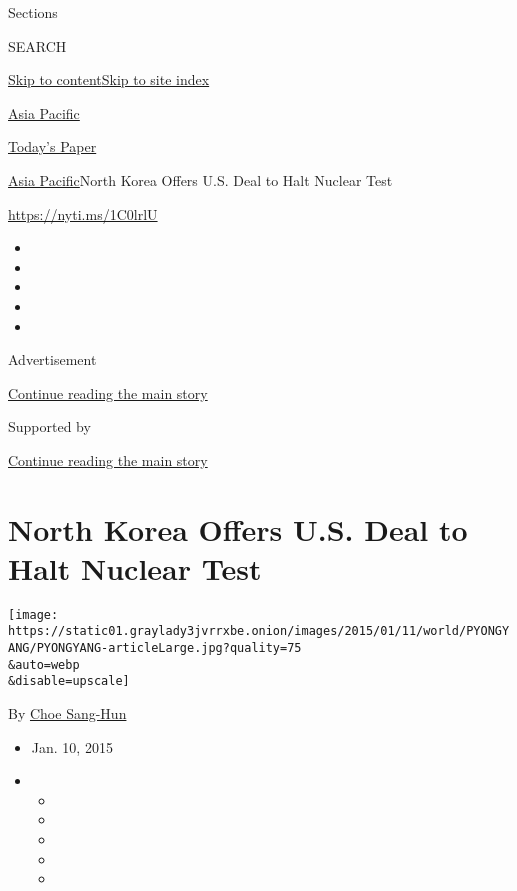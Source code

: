 Sections

SEARCH

\protect\hyperlink{site-content}{Skip to
content}\protect\hyperlink{site-index}{Skip to site index}

\href{https://www.nytimes3xbfgragh.onion/section/world/asia}{Asia
Pacific}

\href{https://myaccount.nytimes3xbfgragh.onion/auth/login?response_type=cookie\&client_id=vi}{}

\href{https://www.nytimes3xbfgragh.onion/section/todayspaper}{Today's
Paper}

\href{/section/world/asia}{Asia Pacific}\textbar{}North Korea Offers
U.S. Deal to Halt Nuclear Test

\url{https://nyti.ms/1C0lrlU}

\begin{itemize}
\item
\item
\item
\item
\item
\end{itemize}

Advertisement

\protect\hyperlink{after-top}{Continue reading the main story}

Supported by

\protect\hyperlink{after-sponsor}{Continue reading the main story}

\hypertarget{north-korea-offers-us-deal-to-halt-nuclear-test}{%
\section{North Korea Offers U.S. Deal to Halt Nuclear
Test}\label{north-korea-offers-us-deal-to-halt-nuclear-test}}

\texttt{[image: https://static01.graylady3jvrrxbe.onion/images/2015/01/11/world/PYONGYANG/PYONGYANG-articleLarge.jpg?quality=75\\\&auto=webp\\\&disable=upscale]}

By \href{http://www.nytimes3xbfgragh.onion/by/choe-sang-hun}{Choe
Sang-Hun}

\begin{itemize}
\item
  Jan. 10, 2015
\item
  \begin{itemize}
  \item
  \item
  \item
  \item
  \item
  \end{itemize}
\end{itemize}

